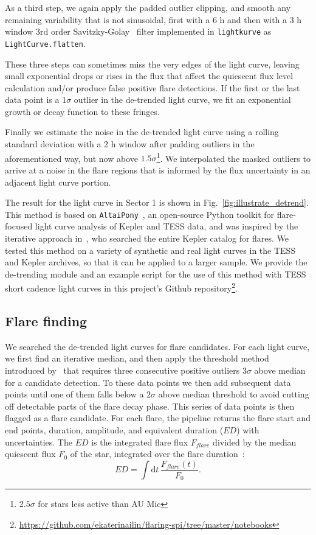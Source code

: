 \documentclass[fleqn,usenatbib]{mnras}%
\begin{document}
As a third step, we again apply the padded outlier clipping, and smooth any remaining variability that is not sinusoidal, first with a 6 h and then with a 3 h window 3rd order Savitzky-Golay~\citep{savitzky1964} filter implemented in \texttt{lightkurve} as \texttt{LightCurve.flatten}.

These three steps can sometimes miss the very edges of the light curve, leaving small exponential drops or rises in the flux that affect the quiescent flux level calculation and/or produce false positive flare detections. If the first or the last data point is a $1\sigma$ outlier in the de-trended light curve, we fit an exponential growth or decay function to these fringes.

Finally we estimate the noise in the de-trended light curve using a rolling standard deviation with a 2 h window after padding outliers in the aforementioned way, but now above $1.5 \sigma$\footnote{$2.5 \sigma$ for stars less active than AU Mic}. We interpolated the masked outliers to arrive at a noise in the flare regions that is informed by the flux uncertainty in an adjacent light curve portion.

The result for the light curve in Sector 1 is shown in Fig.~\ref{fig:illustrate_detrend}. This method is based on \texttt{AltaiPony}~\citep{ilin2021altaipony}, an open-source Python toolkit for flare-focused light curve analysis of Kepler and TESS data, and was inspired by the iterative approach in~\citet{davenport2016}, who searched the entire Kepler catalog for flares. We tested this method on a variety of synthetic and real light curves in the TESS and Kepler archives, so that it can be applied to a larger sample. We provide the de-trending module and an example script for the use of this method with TESS short cadence light curves in this project's Github repository\footnote{\url{https://github.com/ekaterinailin/flaring-spi/tree/master/notebooks}}.

\subsection{Flare finding}
\label{sec:flarefind}
We searched the de-trended light curves for flare candidates. For each light curve, we first find an iterative median, and then apply the threshold method introduced by~\citep{chang2015} that requires three consecutive positive outliers $3 \sigma$ above median for a candidate detection. To these data points we then add subsequent data points until one of them falls below a $2 \sigma$ above median threshold to avoid cutting off detectable parts of the flare decay phase. This series of data points is then flagged as a flare candidate. For each flare, the pipeline returns the flare start and end points, duration, amplitude, and equivalent duration ($ED$) with uncertainties. The $ED$ is the integrated flare flux $F_{flare}$ divided by the median quiescent flux $F_0$ of the star, integrated over the flare duration~\citep{gershberg1972}:
\begin{equation}
\label{eq:ED}
ED=\displaystyle \int \mathrm dt\, \frac{F_{flare}(t)}{F_0}.
\end{equation}
\end{document}

